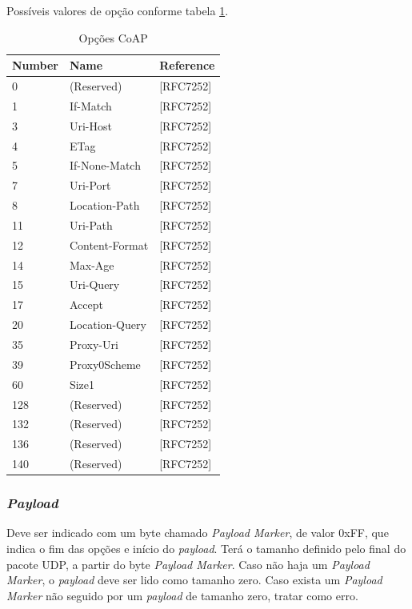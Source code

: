 Possíveis valores de opção conforme tabela \ref{coap_opcoes}.
\begin{table}[!htb]
	\centering
	\caption{Opções CoAP}
	\label{coap_opcoes}
	\begin{tabular}{l|l|l}
		Number & Name           & Reference  \\ \hline
		0      & (Reserved)     & [RFC7252]  \\ \hline
		1      & If-Match       & [RFC7252]  \\ \hline
		3      & Uri-Host       & [RFC7252]  \\ \hline
		4      & ETag           & [RFC7252]  \\ \hline
		5      & If-None-Match  & [RFC7252]  \\ \hline
		7      & Uri-Port       & [RFC7252]  \\ \hline
		8      & Location-Path  & [RFC7252]  \\ \hline
		11     & Uri-Path       & [RFC7252]  \\ \hline
		12     & Content-Format & [RFC7252]  \\ \hline
		14     & Max-Age        & [RFC7252]  \\ \hline
		15     & Uri-Query      & [RFC7252]  \\ \hline
		17     & Accept         & [RFC7252]  \\ \hline
		20     & Location-Query & [RFC7252]  \\ \hline
		35     & Proxy-Uri      & [RFC7252]  \\ \hline
		39     & Proxy0Scheme   & [RFC7252]  \\ \hline
		60     & Size1          & [RFC7252]  \\ \hline
		128    & (Reserved)     & [RFC7252]  \\ \hline
		132    & (Reserved)     & [RFC7252]  \\ \hline
		136    & (Reserved)     & [RFC7252]  \\ \hline
		140    & (Reserved)     & [RFC7252] 
	\end{tabular}
\end{table}

\hfill \break
\hfill \break
\hfill \break
\hfill \break
\hfill \break
\hfill \break
\subsubsection {\textit{Payload}}

Deve ser indicado com um byte chamado \textit{Payload Marker}, de valor 0xFF, que indica o fim das opções e início do \textit{payload}. Terá o tamanho definido pelo final do pacote UDP, a partir do byte \textit{Payload Marker}. Caso não haja um \textit{Payload Marker}, o \textit{payload} deve ser lido como tamanho zero. Caso exista um \textit{Payload Marker} não seguido por um \textit{payload} de tamanho zero, tratar como erro.

